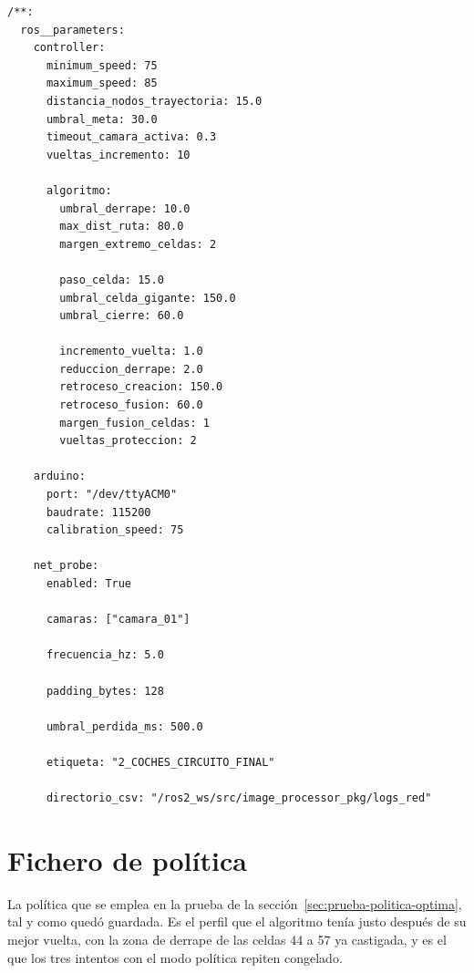 \begin{lstlisting}[style=codigo, language=yamlsimple, caption={[Fichero de parámetros, la parte del control, del algoritmo y del Arduino]Fichero de parámetros, la parte del control, del algoritmo y del Arduino (\texttt{config/params.yaml})}, label={lst:params-yaml-2}]
/**:
  ros__parameters:
    controller:
      minimum_speed: 75
      maximum_speed: 85
      distancia_nodos_trayectoria: 15.0
      umbral_meta: 30.0
      timeout_camara_activa: 0.3
      vueltas_incremento: 10

      algoritmo:
        umbral_derrape: 10.0
        max_dist_ruta: 80.0
        margen_extremo_celdas: 2

        paso_celda: 15.0
        umbral_celda_gigante: 150.0
        umbral_cierre: 60.0

        incremento_vuelta: 1.0
        reduccion_derrape: 2.0
        retroceso_creacion: 150.0
        retroceso_fusion: 60.0
        margen_fusion_celdas: 1
        vueltas_proteccion: 2

    arduino:
      port: "/dev/ttyACM0"
      baudrate: 115200
      calibration_speed: 75

    net_probe:
      enabled: True

      camaras: ["camara_01"]

      frecuencia_hz: 5.0

      padding_bytes: 128

      umbral_perdida_ms: 500.0

      etiqueta: "2_COCHES_CIRCUITO_FINAL"

      directorio_csv: "/ros2_ws/src/image_processor_pkg/logs_red"
\end{lstlisting}

\section{Fichero de política}
\label{sec:anexo-politica}

La política que se emplea en la prueba de la sección~\ref{sec:prueba-politica-optima}, tal y como quedó guardada. Es el perfil que el algoritmo tenía justo después de su mejor vuelta, con la zona de derrape de las celdas 44 a 57 ya castigada, y es el que los tres intentos con el modo política repiten congelado.

